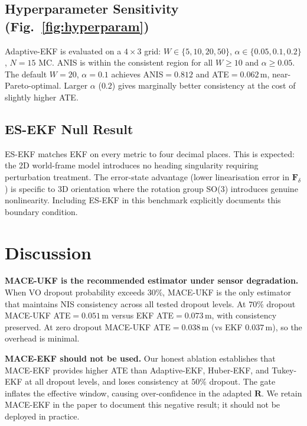 \documentclass[letterpaper, 10pt, journal]{IEEEtran}
\newcommand{\bmF}{\bm{F}}
\newcommand{\bmR}{\bm{R}}
\begin{document}
\subsection{Hyperparameter Sensitivity (Fig.~\ref{fig:hyperparam})}
\label{sec:hyperparam}

Adaptive-EKF is evaluated on a $4{\times}3$ grid:
$W \in \{5,10,20,50\}$, $\alpha \in \{0.05,0.1,0.2\}$, $N=15$ MC.
ANIS is within the consistent region for all $W\!\geq\!10$ and
$\alpha\!\geq\!0.05$. The default $W=20$, $\alpha=0.1$ achieves
ANIS$=0.812$ and ATE$=0.062$\,m, near-Pareto-optimal.
Larger $\alpha$ ($0.2$) gives marginally better consistency
at the cost of slightly higher ATE.

\subsection{ES-EKF Null Result}
\label{sec:esekf_null}

ES-EKF matches EKF on every metric to four decimal places.
This is expected: the 2D world-frame model introduces no heading
singularity requiring perturbation treatment.
The error-state advantage (lower linearisation error in $\bmF_\delta$)
is specific to 3D orientation where the rotation group SO(3) introduces
genuine nonlinearity. Including ES-EKF in this benchmark explicitly
documents this boundary condition.

\section{Discussion}
\label{sec:discussion}

\textbf{MACE-UKF is the recommended estimator under sensor degradation.}
When VO dropout probability exceeds $30\%$, MACE-UKF is the only estimator
that maintains NIS consistency across all tested dropout levels.
At $70\%$ dropout MACE-UKF ATE$=0.051$\,m versus EKF ATE$=0.073$\,m,
with consistency preserved. At zero dropout MACE-UKF ATE$=0.038$\,m
(vs EKF $0.037$\,m), so the overhead is minimal.

\textbf{MACE-EKF should not be used.}
Our honest ablation establishes that MACE-EKF provides higher ATE
than Adaptive-EKF, Huber-EKF, and Tukey-EKF at all dropout levels,
and loses consistency at $50\%$ dropout. The gate inflates the effective
window, causing over-confidence in the adapted $\bmR$.
We retain MACE-EKF in the paper to document this negative result;
it should not be deployed in practice.
\end{document}
